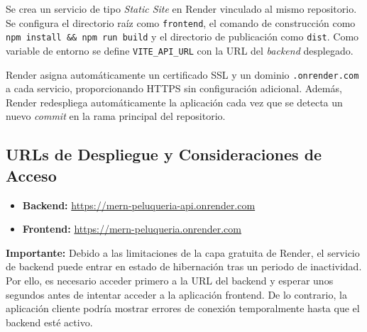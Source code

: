 Se crea un servicio de tipo \textit{Static Site} en Render vinculado al mismo repositorio. Se configura el directorio ra\'iz como \texttt{frontend}, el comando de construcci\'on como \texttt{npm install \&\& npm run build} y el directorio de publicaci\'on como \texttt{dist}. Como variable de entorno se define \texttt{VITE\_API\_URL} con la URL del \textit{backend} desplegado.

Render asigna autom\'aticamente un certificado SSL y un dominio \texttt{.onrender.com} a cada servicio, proporcionando HTTPS sin configuraci\'on adicional. Adem\'as, Render redespliega autom\'aticamente la aplicaci\'on cada vez que se detecta un nuevo \textit{commit} en la rama principal del repositorio.

\subsection{URLs de Despliegue y Consideraciones de Acceso}\label{subsec:urls-render}

\begin{itemize}
    \item \textbf{Backend:} \url{https://mern-peluqueria-api.onrender.com}
    \item \textbf{Frontend:} \url{https://mern-peluqueria.onrender.com}
\end{itemize}

\textbf{Importante:} Debido a las limitaciones de la capa gratuita de Render, el servicio de backend puede entrar en estado de hibernación tras un periodo de inactividad. Por ello, es necesario acceder primero a la URL del backend y esperar unos segundos antes de intentar acceder a la aplicación frontend. De lo contrario, la aplicación cliente podría mostrar errores de conexión temporalmente hasta que el backend esté activo.
